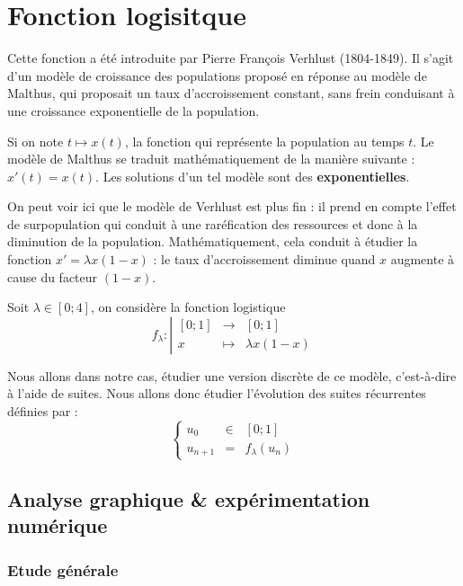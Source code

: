 \chapter{Fonction logisitque}
Cette fonction a été introduite par Pierre François Verhlust (1804-1849). Il s'agit d'un modèle de croissance des populations proposé en réponse au modèle de Malthus, qui proposait un taux d'accroissement constant, sans frein conduisant à une croissance exponentielle de la population.

Si on note $t\mapsto x(t)$, la fonction qui représente la population au temps $t$. Le modèle de Malthus se traduit mathématiquement de la manière suivante : $x'(t)=x(t)$. Les solutions d'un tel modèle sont des \textbf{exponentielles}.

On peut voir ici que le modèle de Verhlust est plus fin : il prend en compte l'effet de \og surpopulation\fg{} qui conduit à une raréfication des ressources et donc à la diminution de la population. Mathématiquement, cela conduit à étudier la fonction $x'=\lambda x(1-x)$ : le taux d'accroissement diminue quand $x$ augmente à cause du facteur $(1-x)$.

\begin{axiome}
Soit $\lambda \in [0;4]$, on considère la fonction logistique
\[
    f_\lambda : \left|
    \begin{array}{ccc}
        [0;1] &\longrightarrow& [0;1] \\
        x &\mapsto& \lambda x(1-x)
    \end{array}
    \right.  
\]
\end{axiome}

Nous allons dans notre cas, étudier une version discrète de ce modèle, c'est-à-dire à l'aide de suites. Nous allons donc étudier l'évolution des suites récurrentes définies par :
\[
    \left\{
    \begin{array}{rcl}
            u_0 &\in& [0;1] \\
            u_{n+1} &=& f_\lambda(u_n)
    \end{array}
    \right.
\]

\section{Analyse graphique \& expérimentation numérique}
\subsection{Etude générale}


